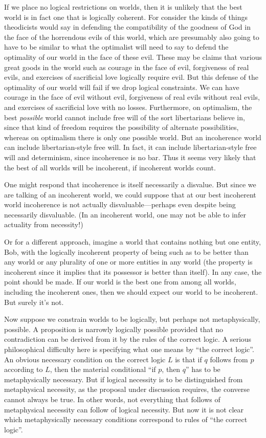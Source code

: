 If we place no logical restrictions on worlds, then it is unlikely that the best world is in fact one that is 
logically coherent. For consider the kinds of things theodicists would say in defending the compatibility of 
the goodness of God in the face of the horrendous evils of this world, which are presumably also going to have 
to be similar to what the optimalist will need to say to defend the optimality of our world in the face of these
evil. These may be claims that various great goods in the world such as courage in the face of evil, forgiveness of 
real evils, and exercises of sacrificial love logically require evil. But this defense of the optimality of our world will fail if we drop logical constraints. We can have courage in the face of evil without evil, forgiveness of real evils without
real evils, and exercises of sacrificial love with no losses. Furthermore, on optimalism, the best 
\textit{possible} world cannot include free will of the sort libertarians believe in, since that kind of freedom
requires the possibility of alternate possibilities, whereas on optimalism there is only one possible world. But an 
incoherence world can include libertarian-style free will. In fact, it can include libertarian-style free will and 
determinism, since incoherence is no bar. Thus it seems very likely that the best of all worlds will be incoherent, 
if incoherent worlds count.

One might respond that incoherence is itself necessarily a disvalue. But since we are talking of an incoherent world, we could 
suppose that at our best incoherent world incoherence is not actually disvaluable---perhaps even despite being necessarily 
disvaluable. (In an incoherent world, one may not be able to infer actuality from necessity!)

Or for a different approach, imagine a world that contains nothing but one entity, Bob, with the logically incoherent property 
of being such as to be better than any world or any plurality of one or more entities in any world (the property is incoherent
since it implies that its possessor is better than itself). In any case, the point should be made. If our world is the best
one from among all worlds, including the incoherent ones, then we should expect our world to be incoherent. But surely it's not.

Now suppose we constrain worlds to be logically, but perhaps not metaphysically, possible. A proposition is narrowly logically
possible provided that no contradiction can be derived from it by the rules of the correct logic. A serious philosophical 
difficulty here is specifying what one means by ``the correct logic''. An obvious necessary condition on the correct logic $L$
is that if $q$ follows from $p$ according to $L$, then the material conditional ``if $p$, then $q$'' has to be metaphysically
necessary. But if logical necessity is to be distinguished from metaphysical necessity, as the proposal under discussion requires,
the converse cannot always be true. In other words, not everything that follows of metaphysical necessity can follow of logical
necessity. But now it is not clear which metaphysically necessary conditions correspond to rules of ``the correct logic''.

